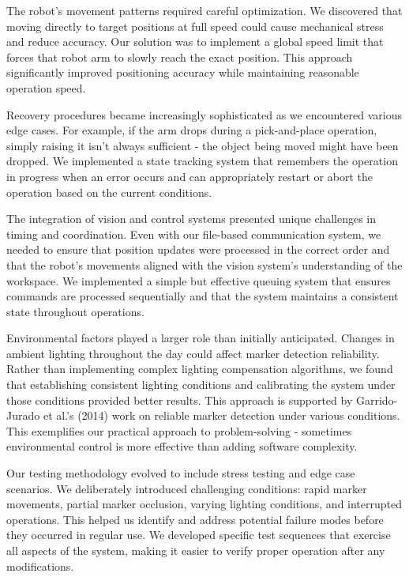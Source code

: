 \documentclass[10pt,twocolumn]{article}
\begin{document}
The robot's movement patterns required careful optimization. We discovered that moving directly to target positions at full speed could cause mechanical stress and reduce accuracy. Our solution was to implement a global speed limit that forces that robot arm to slowly reach the exact position. This approach significantly improved positioning accuracy while maintaining reasonable operation speed.

Recovery procedures became increasingly sophisticated as we encountered various edge cases. For example, if the arm drops during a pick-and-place operation, simply raising it isn't always sufficient - the object being moved might have been dropped. We implemented a state tracking system that remembers the operation in progress when an error occurs and can appropriately restart or abort the operation based on the current conditions.

The integration of vision and control systems presented unique challenges in timing and coordination. Even with our file-based communication system, we needed to ensure that position updates were processed in the correct order and that the robot's movements aligned with the vision system's understanding of the workspace. We implemented a simple but effective queuing system that ensures commands are processed sequentially and that the system maintains a consistent state throughout operations.

Environmental factors played a larger role than initially anticipated. Changes in ambient lighting throughout the day could affect marker detection reliability. Rather than implementing complex lighting compensation algorithms, we found that establishing consistent lighting conditions and calibrating the system under those conditions provided better results. This approach is supported by Garrido-Jurado et al.'s (2014) \cite{garrido2014automatic} work on reliable marker detection under various conditions. This exemplifies our practical approach to problem-solving - sometimes environmental control is more effective than adding software complexity.

Our testing methodology evolved to include stress testing and edge case scenarios. We deliberately introduced challenging conditions: rapid marker movements, partial marker occlusion, varying lighting conditions, and interrupted operations. This helped us identify and address potential failure modes before they occurred in regular use. We developed specific test sequences that exercise all aspects of the system, making it easier to verify proper operation after any modifications.
\end{document}

